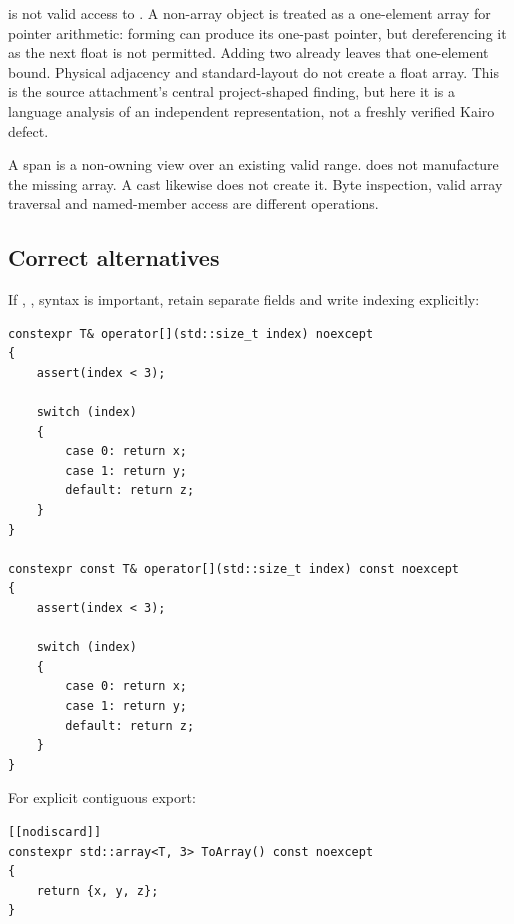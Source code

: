  is not valid access to . A non-array object is treated as a one-element array for pointer arithmetic: forming  can produce its one-past pointer, but dereferencing it as the next float is not permitted. Adding two already leaves that one-element bound. Physical adjacency and standard-layout do not create a float array. This is the source attachment's central project-shaped finding, but here it is a language analysis of an independent representation, not a freshly verified Kairo defect.

A span is a non-owning view over an existing valid range.  does not manufacture the missing array. A cast likewise does not create it. Byte inspection, valid array traversal and named-member access are different operations.

\subsection{Correct alternatives}\label{05-engine-i-ch003-correct-alternatives}

\hypertarget{05-engine-i-ch003-correct-alternatives}{}

If , ,  syntax is important, retain separate fields and write indexing explicitly:

\begin{verbatim}
constexpr T& operator[](std::size_t index) noexcept
{
    assert(index < 3);

    switch (index)
    {
        case 0: return x;
        case 1: return y;
        default: return z;
    }
}

constexpr const T& operator[](std::size_t index) const noexcept
{
    assert(index < 3);

    switch (index)
    {
        case 0: return x;
        case 1: return y;
        default: return z;
    }
}
\end{verbatim}

For explicit contiguous export:

\begin{verbatim}
[[nodiscard]]
constexpr std::array<T, 3> ToArray() const noexcept
{
    return {x, y, z};
}
\end{verbatim}


